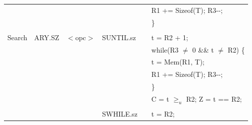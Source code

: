 \begin{table}
\begin{subtable}{\linewidth}
\begin{center}
\begin{tabular}{llllll}
                   &                   &                                       &                   &                   & \quad R1 += Sizeof(T); R3-{}-;                                                \\
                   &                   &                                       &                   &                   & \}                                                                            \\
                   &                   &                                       &                   &                   &                                                                               \\
Search             & ARY.SZ            & $<$opc$>$                             & SUNTIL.sz         & \flags{--!!}      & t = R2 + 1;                                                                   \\
                   &                   &                                       &                   &                   & while(R3 $\ne$ 0 \&\& t $\ne$ R2) \{                                          \\
                   &                   &                                       &                   &                   & \quad t = Mem(R1, T);                                                         \\
                   &                   &                                       &                   &                   & \quad R1 += Sizeof(T); R3-{}-;                                                \\
                   &                   &                                       &                   &                   & \}                                                                            \\
                   &                   &                                       &                   &                   & C = t $\ge_u$ R2; Z = t == R2;                                                \\
                   &                   &                                       &                   &                   &                                                                               \\
                   &                   &                                       & SWHILE.sz         & \flags{--!!}      & t = R2;                                                                       \\

\end{tabular}
\end{center}
\end{subtable}
\end{table}
